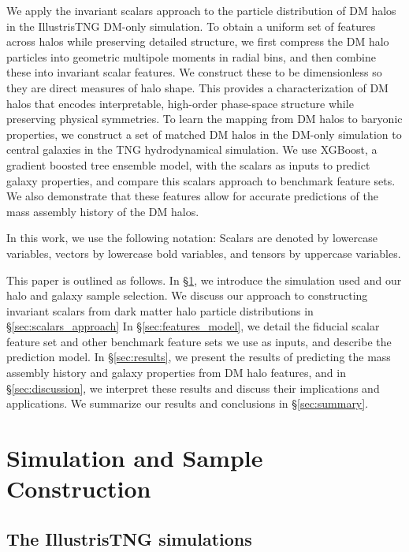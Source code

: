 We apply the invariant scalars approach to the particle distribution of DM halos in the IllustrisTNG DM-only simulation.
To obtain a uniform set of features across halos while preserving detailed structure, we first compress the DM halo particles into geometric multipole moments in radial bins, and then combine these into invariant scalar features.
We construct these to be dimensionless so they are direct measures of halo shape.
This provides a characterization of DM halos that encodes interpretable, high-order phase-space structure while preserving physical symmetries.
To learn the mapping from DM halos to baryonic properties, we construct a set of matched DM halos in the DM-only simulation to central galaxies in the TNG hydrodynamical simulation.
We use XGBoost, a gradient boosted tree ensemble model, with the scalars as inputs to predict galaxy properties, and compare this scalars approach to benchmark feature sets. 
We also demonstrate that these features allow for accurate predictions of the mass assembly history of the DM halos.

In this work, we use the following notation: 
Scalars are denoted by lowercase variables, vectors by lowercase bold variables, and tensors by uppercase variables.

This paper is outlined as follows.
In \S\ref{sec:sim_sample}, we introduce the simulation used and our halo and galaxy sample selection. 
We discuss our approach to constructing invariant scalars from dark matter halo particle distributions in \S\ref{sec:scalars_approach} 
In \S\ref{sec:features_model}, we detail the fiducial scalar feature set and other benchmark feature sets we use as inputs, and describe the prediction model.
In \S\ref{sec:results}, we present the results of predicting the mass assembly history and galaxy properties from DM halo features, and in \S\ref{sec:discussion}, we interpret these results and discuss their implications and applications.
We summarize our results and conclusions in \S\ref{sec:summary}.


\section{Simulation and Sample Construction}
\label{sec:sim_sample}

\subsection{The IllustrisTNG simulations}
\label{sec:sim}

